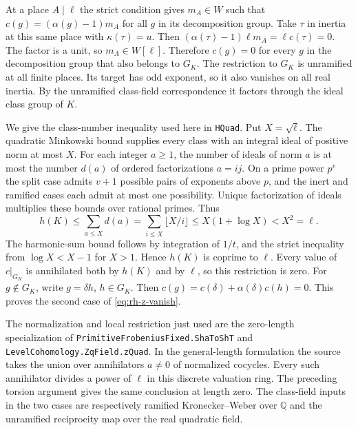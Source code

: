 At a place \(A\mid\ell\) the strict condition gives \(m_A\in W\)
such that \(c(g)=(\alpha(g)-1)m_A\) for all \(g\) in its
decomposition group. Take \(\tau\) in inertia at this same place
with \(\kappa(\tau)=u\). Then
\((\alpha(\tau)-1)\ell m_A=\ell c(\tau)=0\). The factor is a unit,
so \(m_A\in W[\ell]\). Therefore \(c(g)=0\) for every
\(g\) in the decomposition group that also belongs to \(G_K\).
The restriction to \(G_K\) is unramified at all finite places.
Its target has odd exponent, so it also vanishes on all real inertia.
By the unramified class-field correspondence it factors through the
ideal class group of \(K\).

We give the class-number inequality used here in \texttt{HQuad}.
Put \(X=\sqrt{\ell}\). The quadratic Minkowski bound supplies every
class with an integral ideal of positive norm at most \(X\).
For each integer \(a\ge1\), the number of ideals of norm \(a\) is
at most the number \(d(a)\) of ordered factorizations \(a=ij\).
On a prime power \(p^v\) the split case admits \(v+1\) possible
pairs of exponents above \(p\), and the inert and ramified cases
each admit at most one possibility. Unique factorization of ideals
multiplies these bounds over rational primes. Thus
\[
    h(K)\le\sum_{a\le X}d(a)
      =\sum_{i\le X}\lfloor X/i\rfloor
      \le X(1+\log X)<X^2=\ell .
\]
The harmonic-sum bound follows by integration of \(1/t\), and the
strict inequality from \(\log X<X-1\) for \(X>1\).
Hence \(h(K)\) is coprime to \(\ell\). Every value of \(c|_{G_K}\)
is annihilated both by \(h(K)\) and by \(\ell\), so this restriction
is zero. For \(g\notin G_K\), write \(g=\delta h\), \(h\in G_K\).
Then \(c(g)=c(\delta)+\alpha(\delta)c(h)=0\).
This proves the second case of \eqref{eq:rh-z-vanish}.

The normalization and local restriction just used are the zero-length
specialization of \texttt{Primitive\allowbreak{}Frobenius\allowbreak{}Fixed.\allowbreak{}Sha\allowbreak{}To\allowbreak{}Sh\allowbreak{}T} and
\texttt{Level\allowbreak{}Cohomology.\allowbreak{}Zq\allowbreak{}Field.\allowbreak{}z\allowbreak{}Quad}. In the general-length
formulation the source takes the union over annihilators \(a\ne0\) of
normalized cocycles. Every such annihilator divides a power of \(\ell\)
in this discrete valuation ring. The preceding torsion argument gives
the same conclusion at length zero. The class-field inputs in the
two cases are respectively ramified Kronecker--Weber over \(\mathbb Q\)
and the unramified reciprocity map over the real quadratic field.

